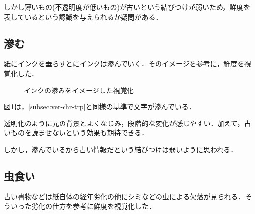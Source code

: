 しかし薄いもの(不透明度が低いもの)が古いという結びつけが弱いため，鮮度を表しているという認識を与えられるか疑問がある．

\subsection{滲む}
\label{subsec:ver-chr-bld}

紙にインクを垂らすとにインクは滲んでいく．そのイメージを参考に，鮮度を視覚化した．

\begin{figure}[htbp]
  \begin{center}
  \end{center}
  \caption{インクの滲みをイメージした視覚化}
  \label{fig:ver-bleeding}
\end{figure}

図\ref{fig:ver-bleeding}は，\ref{subsec:ver-chr-trp}と同様の基準で文字が滲んでいる．

透明化のように元の背景とよくなじみ，段階的な変化が感じやすい．加えて，古いものを読ませないという効果も期待できる．

しかし，滲んでいるから古い情報だという結びつけは弱いように思われる．

\subsection{虫食い}
\label{subsec:ver-chr-wh}

古い書物などは紙自体の経年劣化の他にシミなどの虫による欠落が見られる．そういった劣化の仕方を参考に鮮度を視覚化した．

